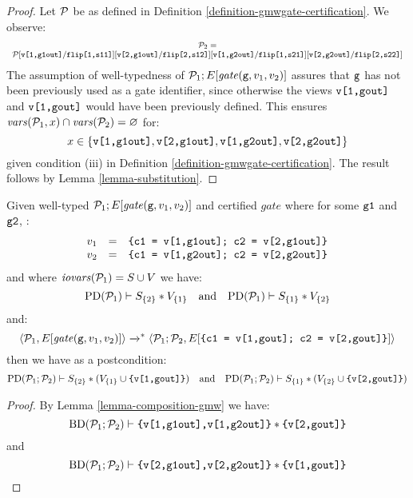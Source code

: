 \begin{proof}
  Let $\mathcal{P}$ be as defined in Definition \ref{definition-gmwgate-certification}.
  We observe:
  $$
  {\footnotesize
    \begin{array}{c}
      \mathcal{P}_2 = \\
      \mathcal{P}[\texttt{v[1,g1out]}/\texttt{flip[1,s11]}][\texttt{v[2,g1out]}/\texttt{flip[2,s12]}][\texttt{v[1,g2out]}/\texttt{flip[1,s21]}][\texttt{v[2,g2out]}/\texttt{flip[2,s22]}]
    \end{array}
  }
  $$
  The assumption of well-typedness of $\mathcal{P}_1;E[\mathit{gate}(\texttt{g},v_1,v_2)]$ assures
  that $\texttt{g}$ has not been previously used as a gate identifier, since otherwise the
  views $\texttt{v[1,gout]}$ and $\texttt{v[1,gout]}$ would have been previously defined. This
  ensures $\mathit{vars}(\mathcal{P}_1,x) \cap
  \mathit{vars}(\mathcal{P}_2) = \varnothing$ for:
  $$x \in \{ \texttt{v[1,g1out]}, \texttt{v[2,g1out]}, \texttt{v[1,g2out]}, \texttt{v[2,g2out]}\}$$
  given condition (iii) in Definition \ref{definition-gmwgate-certification}.
  The result follows by Lemma \ref{lemma-substitution}. 
\end{proof}

\begin{lemma}
  \label{lemma-preservation-gmw}
  Given well-typed $\mathcal{P}_1;E[\mathit{gate}(\texttt{g},v_1,v_2)]$ and certified $\mathit{gate}$ where
  for some $\texttt{g1}$ and $\texttt{g2}$, :
  $$
  \begin{array}{lcr}
   v_1 &=& \texttt{\{c1 = v[1,g1out]; c2 = v[2,g1out]\}}\\
   v_2 &=& \texttt{\{c1 = v[1,g2out]; c2 = v[2,g2out]\}}
  \end{array}
  $$
  and where $\mathit{iovars}(\mathcal{P}_1) = S \cup V$ we have:
  $$
  \mathrm{PD}(\mathcal{P}_1) \vdash S_{\{2\}} * V_{\{1\}}
  \quad \text{and} \quad \mathrm{PD}(\mathcal{P}_1) \vdash S_{\{1\}} * V_{\{2\}}
  $$
  and:
  $$
  \langle \mathcal{P}_1,E[\mathit{gate}(\texttt{g},v_1,v_2)] \rangle \xrightarrow{}^{*} \langle \mathcal{P}_1;\mathcal{P}_2,E[\texttt{\{c1 = v[1,gout]; c2 = v[2,gout]\}}] \rangle
  $$
  then we have as a postcondition:
  $$\mathrm{PD}(\mathcal{P}_1;\mathcal{P}_2) \vdash S_{\{2\}} * (V_{\{1\}} \cup \texttt{\{v[1,gout]\}})
  \quad \text{and}\quad \mathrm{PD}(\mathcal{P}_1;\mathcal{P}_2) \vdash S_{\{1\}} * (V_{\{2\}} \cup \texttt{\{v[2,gout]\}})$$
\end{lemma}

\begin{proof}
By Lemma \ref{lemma-composition-gmw} we have:
$$\mathrm{BD}(\mathcal{P}_1;\mathcal{P}_2) \vdash \texttt{\{v[1,g1out],v[1,g2out]\}} * \texttt{\{v[2,gout]\}}$$
and
$$\mathrm{BD}(\mathcal{P}_1;\mathcal{P}_2) \vdash \texttt{\{v[2,g1out],v[2,g2out]\}} * \texttt{\{v[1,gout]\}}$$
\end{proof}

